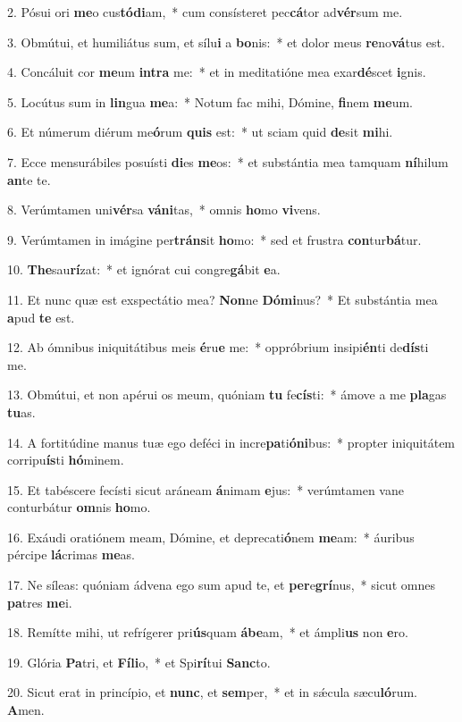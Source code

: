 2. Pósui ori \textbf{me}o cus\textbf{tó}\textbf{di}am,~*  cum consísteret pec\textbf{cá}tor ad\textbf{vér}sum me.\

3. Obmútui, et humiliátus sum, et sílu\textbf{i} a \textbf{bo}nis:~*  et dolor meus \textbf{re}no\textbf{vá}tus est.\

4. Concáluit cor \textbf{me}um \textbf{in}\textbf{tra} me:~*  et in meditatióne mea exar\textbf{dé}scet \textbf{i}gnis.\

5. Locútus sum in \textbf{lin}gua \textbf{me}a:~*  Notum fac mihi, Dómine, \textbf{fi}nem \textbf{me}um.\

6. Et númerum diérum me\textbf{ó}rum \textbf{quis} est:~*  ut sciam quid \textbf{de}sit \textbf{mi}hi.\

7. Ecce mensurábiles posuísti \textbf{di}es \textbf{me}os:~*  et substántia mea tamquam \textbf{ní}hilum \textbf{an}te te.\

8. Verúmtamen uni\textbf{vér}sa \textbf{vá}\textbf{ni}tas,~*  omnis \textbf{ho}mo \textbf{vi}vens.\

9. Verúmtamen in imágine per\textbf{tráns}it \textbf{ho}mo:~*  sed et frustra \textbf{con}tur\textbf{bá}tur.\

10. \textbf{The}sau\textbf{rí}zat:~*  et ignórat cui congre\textbf{gá}bit \textbf{e}a.\

11. Et nunc quæ est exspectátio mea? \textbf{Non}ne \textbf{Dó}\textbf{mi}nus?~*  Et substántia mea \textbf{a}pud \textbf{te} est.\

12. Ab ómnibus iniquitátibus meis \textbf{é}ru\textbf{e} me:~*  oppróbrium insipi\textbf{én}ti de\textbf{dís}ti me.\

13. Obmútui, et non apérui os meum, quóniam \textbf{tu} fe\textbf{cís}ti:~*  ámove a me \textbf{pla}gas \textbf{tu}as.\

14. A fortitúdine manus tuæ ego deféci in incre\textbf{pa}ti\textbf{ó}\textbf{ni}bus:~*  propter iniquitátem corripu\textbf{ís}ti \textbf{hó}minem.\

15. Et tabéscere fecísti sicut aráneam \textbf{á}nimam \textbf{e}jus:~*  verúmtamen vane conturbátur \textbf{om}nis \textbf{ho}mo.\

16. Exáudi oratiónem meam, Dómine, et deprecati\textbf{ó}nem \textbf{me}am:~*  áuribus pércipe \textbf{lá}crimas \textbf{me}as.\

17. Ne síleas: quóniam ádvena ego sum apud te, et \textbf{per}e\textbf{grí}nus,~*  sicut omnes \textbf{pa}tres \textbf{me}i.\

18. Remítte mihi, ut refrígerer pri\textbf{ús}quam \textbf{á}\textbf{be}am,~*  et ámpli\textbf{us} non \textbf{e}ro.\

19. Glória \textbf{Pa}tri, et \textbf{Fí}\textbf{li}o,~*  et Spi\textbf{rí}tui \textbf{Sanc}to.\

20. Sicut erat in princípio, et \textbf{nunc}, et \textbf{sem}per,~*  et in sǽcula sæcu\textbf{ló}rum. \textbf{A}men.\

